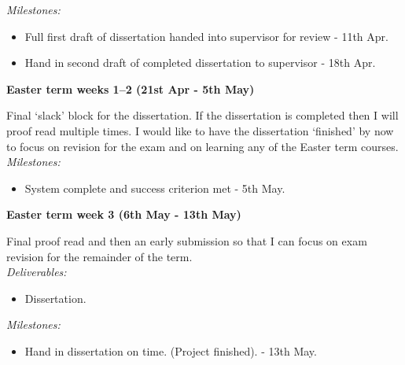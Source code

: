 \documentclass[12pt,a4paper,twoside]{article}
\begin{document}
{\em Milestones:}
\begin{itemize}
    \item 
    Full first draft of dissertation handed into supervisor for review - 11th 
    Apr.
    \item 
    Hand in second draft of completed dissertation to supervisor - 18th Apr.
\end{itemize}


{\bf Easter term weeks 1--2 (21st Apr - 5th May)}  

Final `slack' block for the dissertation. If the dissertation is completed then 
I will proof read multiple times. I would like to have the dissertation 
`finished' by now to focus on revision for the exam and on learning any of the 
Easter term courses. \\

{\em Milestones:}
\begin{itemize}
    \item 
    System complete and success criterion met - 5th May.
\end{itemize}



{\bf Easter term week 3 (6th May - 13th May)} 

Final proof read and then an early submission so that I can focus on exam 
revision for the remainder of the term. \\

{\em Deliverables:} 
\begin{itemize} 
    \item 
    Dissertation.
\end{itemize}

{\em Milestones:}
\begin{itemize}
    \item 
    Hand in dissertation on time. (Project finished). - 13th May.
\end{itemize}





\end{document}
